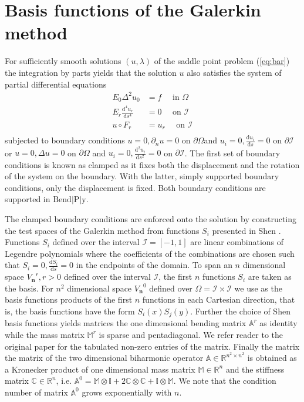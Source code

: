 \documentclass{marine_2015}
\newcommand{\Vh}{\ensuremath{V_{\mathbf{n}}}}
\newcommand{\deriv}[2]{\ensuremath{\frac{\mathrm{d}#1}{\mathrm{d}#2}}}
\newcommand{\tderiv}[2]{\ensuremath{\tfrac{\mathrm{d}#1}{\mathrm{d}#2}}}
\begin{document}
\section{Basis functions of the Galerkin method}
\label{sec:basis}
For sufficiently smooth solutions $\left(u, \lambda\right)$ of the saddle point
problem (\ref{eq:bar}) the integration by parts yields that the solution $u$ also
satisfies the system of partial differential equations
\[
  \begin{aligned}
    E_0\Delta^2u_0 &= f\quad\text{ in }\Omega\\
    E_r\deriv{^4 u_r}{s^4} &= 0\quad\text{ on }\mathcal{I}\\
    u \circ F_r&= u_r\quad\text{ on }\mathcal{I}\\
  \end{aligned}
\]
subjected to boundary conditions $u=0, \partial_nu=0$ on $\partial\Omega $and 
$u_i=0, \tderiv{u_i}{s}=0$ on $\partial\mathcal{I}$
or $u=0, \Delta u=0$ on $\partial\Omega$ and $u_i=0, \tderiv{^2u_i}{s^2}=0$ on
$\partial\mathcal{I}$. The first set of boundary conditions is known as clamped as
it fixes both the displacement and the rotation of the system on the boundary. With
the latter, simply supported boundary conditions, only the displacement is fixed. 
Both boundary conditions are supported in $\text{Bend}\!\left|\text{P}\right|\!\text{y}$. 

The clamped boundary conditions are enforced onto the solution by constructing
the test spaces of the Galerkin method from functions $S_i$ presented in Shen
\cite{shen_paper}. Functions $S_i$ defined over the interval
$\mathcal{I}=\left[-1, 1\right]$ are linear combinations of Legendre
polynomials where the coefficients of the combinations are chosen such that
$S_i=0, \tderiv{S_i}{s}=0$ in the endpoints of the domain. To span an $n$
dimensional space $\Vh^r, r>0$ defined over the interval $\mathcal{I}$, the first 
$n$ functions $S_i$ are taken as the basis. For $n^2$ dimensional space $\Vh^0$ 
defined over $\Omega=\mathcal{I}\times\mathcal{I}$ we use as the basis functions 
products of the first $n$ functions in each Cartesian direction, that is, the basis 
functions have the form $S_i\left(x\right)S_j\left(y\right)$. Further the choice of
Shen basis functions yields matrices the one dimensional bending matrix
$\mathbb{A}^r$ as identity while the mass matrix $\mathbb{M}^r$ is sparse and
pentadiagonal. We refer reader to the original paper \cite{shen_paper} for the
tabulated non-zero entries of the matrix. Finally the matrix the matrix of the two
dimensional biharmonic operator $\mathbb{A}\in\mathbb{R}^{n^2\times n^2}$ is obtained
as a Kronecker product of one dimensional mass matrix $\mathbb{M}\in\mathbb{R}^n$ and 
the stiffness matrix $\mathbb{C}\in\mathbb{R}^n$, i.e. $\mathbb{A}^0 = \mathbb{M}\otimes\mathbb{I} + 
2\mathbb{C}\otimes\mathbb{C} + \mathbb{I}\otimes\mathbb{M}$. We note that the
condition number of matrix $\mathbb{A}^0$ grows exponentially with $n$.
\end{document}
